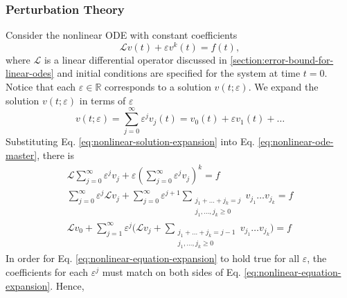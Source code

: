 \documentclass[accepted]{uai2023}
\renewcommand{\L}{\mathcal{L}}
\begin{document}
\subsubsection{Perturbation Theory} \label{section:perturbation-theory}
    Consider the nonlinear ODE with constant coefficients
    {
        \small
        \begin{equation} \label{eq:nonlinear-ode-master}
            \L v(t) + \varepsilon v^k(t) = f(t),
        \end{equation}
    }
    where $\L$ is a linear differential operator discussed in \ref{section:error-bound-for-linear-odes} and initial conditions are specified for the system at time $t=0$. 
    Notice that each $\varepsilon \in \mathbb{R}$ corresponds to a solution $v(t; \varepsilon)$. 
    We expand the solution $v(t; \varepsilon)$ in terms of $\varepsilon$
    {   
        \small
        \begin{equation} \label{eq:nonlinear-solution-expansion}
            v(t; \varepsilon) = \sum_{j=0}^{\infty} \varepsilon^j v_j(t) = v_0(t) + \varepsilon v_1(t) + \dots
        \end{equation}
    }
    Substituting Eq. \ref{eq:nonlinear-solution-expansion} into Eq. \ref{eq:nonlinear-ode-master}, there is
    {
        \small
        \begin{gather}
            \L \sum_{j=0}^{\infty} \varepsilon^j v_j + \varepsilon \left(\sum_{j=0}^{\infty} \varepsilon^j v_j\right)^k = f \\
            \sum_{j=0}^{\infty} \varepsilon^j \L v_j + \sum_{j=0}^{\infty} \varepsilon^{j+1} \sum_{\substack{j_1+\dots+j_k = j\\j_1, \dots, j_k \geq 0}}v_{j_1}\dots v_{j_k} = f \\[-0.5em]
            \L v_0 + \sum_{j=1}^{\infty} \varepsilon^j \Bigg(\L v_j + \sum_{\substack{j_1+\dots+j_k = j - 1\\j_1, \dots, j_k \geq 0}}v_{j_1}\dots v_{j_k}\Bigg)= f \label{eq:nonlinear-equation-expansion} 
        \end{gather}
    }
    In order for Eq. \ref{eq:nonlinear-equation-expansion} to hold true for all $\varepsilon$, the coefficients for each $\varepsilon^j$ must match on both sides of Eq. \ref{eq:nonlinear-equation-expansion}. Hence,
\end{document}
